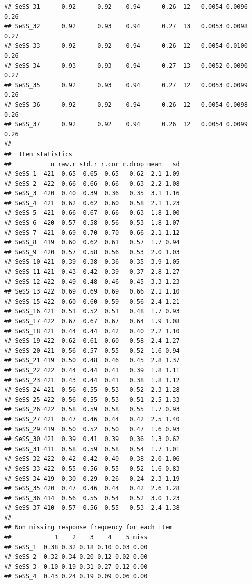 \documentclass[
]{article}
\begin{document}
\begin{verbatim}
## SeSS_31      0.92      0.92    0.94      0.26  12   0.0054 0.0096  0.26
## SeSS_32      0.92      0.93    0.94      0.27  13   0.0053 0.0098  0.27
## SeSS_33      0.92      0.92    0.94      0.26  12   0.0054 0.0100  0.26
## SeSS_34      0.93      0.93    0.94      0.27  13   0.0052 0.0090  0.27
## SeSS_35      0.92      0.93    0.94      0.27  12   0.0053 0.0099  0.26
## SeSS_36      0.92      0.92    0.94      0.26  12   0.0054 0.0098  0.26
## SeSS_37      0.92      0.92    0.94      0.26  12   0.0054 0.0099  0.26
## 
##  Item statistics 
##           n raw.r std.r r.cor r.drop mean   sd
## SeSS_1  421  0.65  0.65  0.65   0.62  2.1 1.09
## SeSS_2  422  0.66  0.66  0.66   0.63  2.2 1.08
## SeSS_3  420  0.40  0.39  0.36   0.35  3.1 1.16
## SeSS_4  421  0.62  0.62  0.60   0.58  2.1 1.23
## SeSS_5  421  0.66  0.67  0.66   0.63  1.8 1.00
## SeSS_6  420  0.57  0.58  0.56   0.53  1.8 1.07
## SeSS_7  421  0.69  0.70  0.70   0.66  2.1 1.12
## SeSS_8  419  0.60  0.62  0.61   0.57  1.7 0.94
## SeSS_9  420  0.57  0.58  0.56   0.53  2.0 1.03
## SeSS_10 421  0.39  0.38  0.36   0.35  3.9 1.05
## SeSS_11 421  0.43  0.42  0.39   0.37  2.8 1.27
## SeSS_12 422  0.49  0.48  0.46   0.45  3.3 1.23
## SeSS_13 422  0.69  0.69  0.69   0.66  2.1 1.10
## SeSS_15 422  0.60  0.60  0.59   0.56  2.4 1.21
## SeSS_16 421  0.51  0.52  0.51   0.48  1.7 0.93
## SeSS_17 422  0.67  0.67  0.67   0.64  1.9 1.08
## SeSS_18 421  0.44  0.44  0.42   0.40  2.2 1.10
## SeSS_19 422  0.62  0.61  0.60   0.58  2.4 1.27
## SeSS_20 421  0.56  0.57  0.55   0.52  1.6 0.94
## SeSS_21 419  0.50  0.48  0.46   0.45  2.8 1.37
## SeSS_22 422  0.44  0.44  0.41   0.39  1.8 1.11
## SeSS_23 421  0.43  0.44  0.41   0.38  1.8 1.12
## SeSS_24 421  0.56  0.55  0.53   0.52  2.3 1.28
## SeSS_25 422  0.56  0.55  0.53   0.51  2.5 1.33
## SeSS_26 422  0.58  0.59  0.58   0.55  1.7 0.93
## SeSS_27 421  0.47  0.46  0.44   0.42  2.5 1.40
## SeSS_29 419  0.50  0.52  0.50   0.47  1.6 0.93
## SeSS_30 421  0.39  0.41  0.39   0.36  1.3 0.62
## SeSS_31 411  0.58  0.59  0.58   0.54  1.7 1.01
## SeSS_32 422  0.42  0.42  0.40   0.38  2.0 1.06
## SeSS_33 422  0.55  0.56  0.55   0.52  1.6 0.83
## SeSS_34 419  0.30  0.29  0.26   0.24  2.3 1.19
## SeSS_35 420  0.47  0.46  0.44   0.42  2.6 1.28
## SeSS_36 414  0.56  0.55  0.54   0.52  3.0 1.23
## SeSS_37 410  0.57  0.56  0.55   0.53  2.4 1.38
## 
## Non missing response frequency for each item
##            1    2    3    4    5 miss
## SeSS_1  0.38 0.32 0.18 0.10 0.03 0.00
## SeSS_2  0.32 0.34 0.20 0.12 0.02 0.00
## SeSS_3  0.10 0.19 0.31 0.27 0.12 0.00
## SeSS_4  0.43 0.24 0.19 0.09 0.06 0.00

\end{verbatim}
\end{document}
